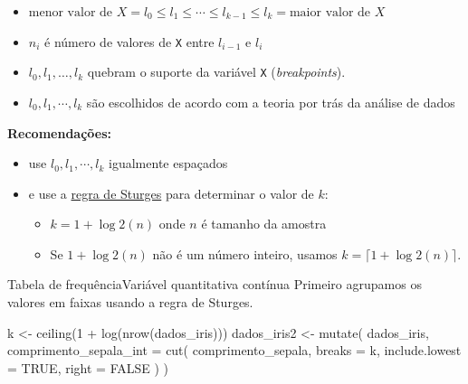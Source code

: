 \documentclass[
  10pt,
  ignorenonframetext,
]{beamer}
\newenvironment{Shaded}{}{}
\newcommand{\DataTypeTok}[1]{#1}
\newcommand{\DecValTok}[1]{#1}
\newcommand{\KeywordTok}[1]{\textcolor[rgb]{0.00,0.00,1.00}{#1}}
\newcommand{\NormalTok}[1]{#1}
\newcommand{\OperatorTok}[1]{#1}
\newcommand{\OtherTok}[1]{\textcolor[rgb]{1.00,0.25,0.00}{#1}}
\newcommand{\StringTok}[1]{\textcolor[rgb]{0.00,0.50,0.50}{#1}}
\providecommand{\tightlist}{%
  \setlength{\itemsep}{0pt}\setlength{\parskip}{0pt}}
\begin{document}
\begin{frame}[fragile]
\begin{itemize}
\tightlist
\item
  \(\text{menor valor de }X = l_0 \leq l_1 \leq \cdots \leq l_{k-1} \leq l_k = \text{maior valor de }X\)
\item
  \(n_i\) é número de valores de \texttt{X} entre \(l_{i-1}\) e \(l_i\)
\item
  \(l_0, l_1, \dots, l_k\) quebram o suporte da variável \texttt{X}
  (\emph{breakpoints}).
\item
  \(l_0, l_1, \cdots, l_k\) são escolhidos de acordo com a teoria por
  trás da análise de dados
\end{itemize}

\textbf{Recomendações:}

\begin{itemize}
\tightlist
\item
  use \(l_0, l_1, \cdots, l_k\) igualmente espaçados
\item
  e use a
  \href{https://onlinelibrary.wiley.com/doi/10.1002/wics.35}{regra de
  Sturges} para determinar o valor de \(k\):

  \begin{itemize}
  \tightlist
  \item
    \(k = 1 + \log2(n)\) onde \(n\) é tamanho da amostra
  \item
    Se \(1 + \log2(n)\) não é um número inteiro, usamos
    \(k = \lceil 1 + \log2(n) \rceil\).
  \end{itemize}
\end{itemize}
\end{frame}

\begin{frame}[fragile]{Tabela de frequência\newline Variável
quantitativa contínua}
\protect\hypertarget{tabela-de-frequuxeanciavariuxe1vel-quantitativa-contuxednua-1}{}
Primeiro agrupamos os valores em faixas usando a regra de Sturges.

\begin{Shaded}
\begin{Highlighting}[]
\NormalTok{k \textless{}{-}}\StringTok{ }\KeywordTok{ceiling}\NormalTok{(}\DecValTok{1} \OperatorTok{+}\StringTok{ }\KeywordTok{log}\NormalTok{(}\KeywordTok{nrow}\NormalTok{(dados\_iris)))}
\NormalTok{dados\_iris2 \textless{}{-}}\StringTok{ }\KeywordTok{mutate}\NormalTok{(}
\NormalTok{  dados\_iris,}
  \DataTypeTok{comprimento\_sepala\_int =} \KeywordTok{cut}\NormalTok{(}
\NormalTok{    comprimento\_sepala,}
    \DataTypeTok{breaks =}\NormalTok{ k,}
    \DataTypeTok{include.lowest =} \OtherTok{TRUE}\NormalTok{,}
    \DataTypeTok{right =} \OtherTok{FALSE}
\NormalTok{  )}
\NormalTok{)}
\end{Highlighting}
\end{Shaded}
\end{frame}
\end{document}
